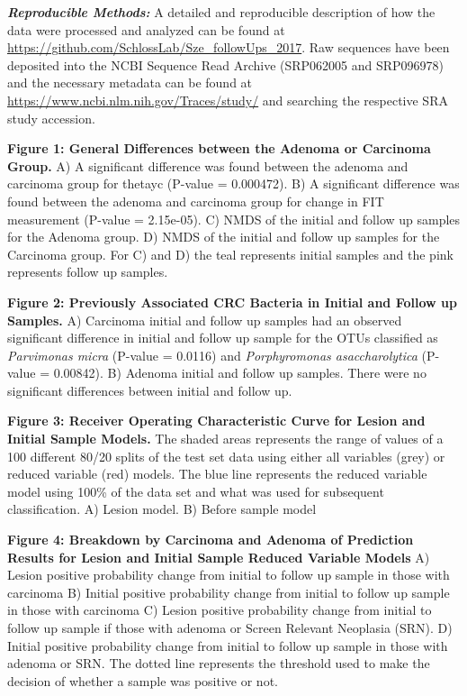 \documentclass[12pt,]{article}
\begin{document}
\textbf{\emph{Reproducible Methods:}} A detailed and reproducible
description of how the data were processed and analyzed can be found at
\url{https://github.com/SchlossLab/Sze_followUps_2017}. Raw sequences
have been deposited into the NCBI Sequence Read Archive (SRP062005 and
SRP096978) and the necessary metadata can be found at
\url{https://www.ncbi.nlm.nih.gov/Traces/study/} and searching the
respective SRA study accession.

\newpage

\textbf{Figure 1: General Differences between the Adenoma or Carcinoma
Group.} A) A significant difference was found between the adenoma and
carcinoma group for thetayc (P-value = 0.000472). B) A significant
difference was found between the adenoma and carcinoma group for change
in FIT measurement (P-value = 2.15e-05). C) NMDS of the initial and
follow up samples for the Adenoma group. D) NMDS of the initial and
follow up samples for the Carcinoma group. For C) and D) the teal
represents initial samples and the pink represents follow up samples.

\textbf{Figure 2: Previously Associated CRC Bacteria in Initial and
Follow up Samples.} A) Carcinoma initial and follow up samples had an
observed significant difference in initial and follow up sample for the
OTUs classified as \emph{Parvimonas micra} (P-value = 0.0116) and
\emph{Porphyromonas asaccharolytica} (P-value = 0.00842). B) Adenoma
initial and follow up samples. There were no significant differences
between initial and follow up.

\textbf{Figure 3: Receiver Operating Characteristic Curve for Lesion and
Initial Sample Models.} The shaded areas represents the range of values
of a 100 different 80/20 splits of the test set data using either all
variables (grey) or reduced variable (red) models. The blue line
represents the reduced variable model using 100\% of the data set and
what was used for subsequent classification. A) Lesion model. B) Before
sample model

\textbf{Figure 4: Breakdown by Carcinoma and Adenoma of Prediction
Results for Lesion and Initial Sample Reduced Variable Models} A) Lesion
positive probability change from initial to follow up sample in those
with carcinoma B) Initial positive probability change from initial to
follow up sample in those with carcinoma C) Lesion positive probability
change from initial to follow up sample if those with adenoma or Screen
Relevant Neoplasia (SRN). D) Initial positive probability change from
initial to follow up sample in those with adenoma or SRN. The dotted
line represents the threshold used to make the decision of whether a
sample was positive or not.
\end{document}
